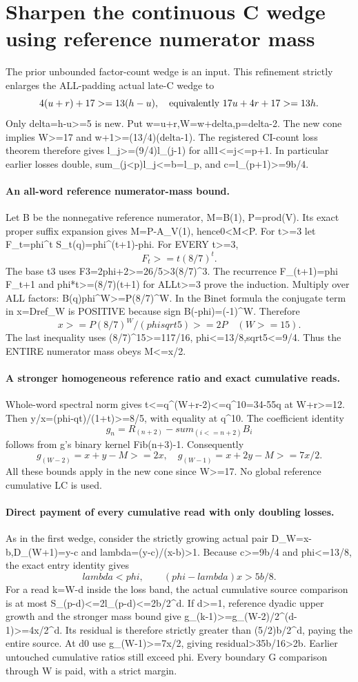 \section{Sharpen the continuous C wedge using reference numerator mass}
The prior unbounded factor-count wedge is an input. This refinement
strictly enlarges the ALL-padding actual late-C wedge to
\[
 4(u+r)+17>=13(h-u),\quad\hbox{equivalently }17u+4r+17>=13h.
\]
Only delta=h-u>=5 is new. Put w=u+r,W=w+delta,p=delta-2.
The new cone implies W>=17 and w+1>=(13/4)(delta-1).
The registered CI-count loss theorem therefore gives
l_j>=(9/4)l_(j-1) for all1<=j<=p+1. In particular earlier losses
double, sum_(j<p)l_j<=b=l_p, and c=l_(p+1)>=9b/4.

\paragraph{An all-word reference numerator-mass bound.}
Let B be the nonnegative reference numerator, M=B(1), P=prod(V).
Its exact proper suffix expansion gives M=P-A_V(1), hence0<M<P.
For t>=3 let F_t=phi^t S_t(q)=phi^(t+1)-phi.
For EVERY t>=3,
\[
 F_t>=t(8/7)^t.
\]
The base t3 uses F3=2phi+2>=26/5>3(8/7)^3. The recurrence
F_(t+1)=phi F_t+1 and phi*t>=(8/7)(t+1) for ALLt>=3
prove the induction. Multiply over ALL factors:
B(q)phi^W>=P(8/7)^W. In the Binet formula the conjugate term
in x=Dref_W is POSITIVE because sign B(-phi)=(-1)^W. Therefore
\[
 x>=P(8/7)^W/(phi sqrt5)>=2P\quad(W>=15).
\]
The last inequality uses (8/7)^15>=117/16,
phi<=13/8,sqrt5<=9/4. Thus the ENTIRE numerator mass obeys M<=x/2.

\paragraph{A stronger homogeneous reference ratio and exact cumulative reads.}
Whole-word spectral norm gives t<=q^(W+r-2)<=q^10=34-55q
at W+r>=12. Then y/x=(phi-qt)/(1+t)>=8/5, with equality at q^10.
The coefficient identity
\[
 g_n=R_(n+2)-sum_(i<=n+2)B_i
\]
follows from g's binary kernel Fib(n+3)-1. Consequently
\[
 g_(W-2)=x+y-M>=2x,\quad
 g_(W-1)=x+2y-M>=7x/2.
\]
All these bounds apply in the new cone since W>=17.
No global reference cumulative LC is used.

\paragraph{Direct payment of every cumulative read with only doubling losses.}
As in the first wedge, consider the strictly growing actual pair
D_W=x-b,D_(W+1)=y-c and lambda=(y-c)/(x-b)>1.
Because c>=9b/4 and phi<=13/8, the exact entry identity gives
\[
 lambda<phi,\qquad(phi-lambda)x>5b/8.
\]
For a read k=W-d inside the loss band, the actual cumulative source
comparison is at most S_(p-d)<=2l_(p-d)<=2b/2^d.
If d>=1, reference dyadic upper growth and the stronger mass bound give
g_(k-1)>=g_(W-2)/2^(d-1)>=4x/2^d. Its residual is therefore
strictly greater than (5/2)b/2^d, paying the entire source.
At d0 use g_(W-1)>=7x/2, giving residual>35b/16>2b.
Earlier untouched cumulative ratios still exceed phi. Every boundary
G comparison through W is paid, with a strict margin.

